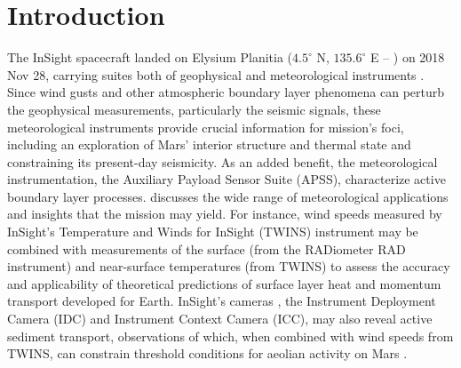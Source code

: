 \documentclass[linenumbers,trackchanges]{aastex63}
\begin{document}

\section{Introduction} \label{sec:Introduction}
The InSight spacecraft landed on Elysium Planitia ($4.5^\circ$ N, $135.6^\circ$ E -- \citealp{2020E&SS....701248G}) on 2018 Nov 28, carrying suites both of geophysical \citep{2020NatGe..13..183B} and meteorological instruments \citep{Banfield2019,2020NatGe..13..190B}. Since wind gusts and other atmospheric boundary layer phenomena can perturb the geophysical measurements, particularly the seismic signals, these meteorological instruments provide crucial information for mission's foci, including an exploration of Mars' interior structure and thermal state and constraining its present-day seismicity. As an added benefit, the meteorological instrumentation, the Auxiliary Payload Sensor Suite (APSS), characterize active boundary layer processes. \citet{2018SSRv..214..109S} discusses the wide range of meteorological applications and insights that the mission may yield. For instance, wind speeds measured by InSight's Temperature and Winds for InSight (TWINS) instrument may be combined with measurements of the surface (from the RADiometer RAD instrument) and near-surface temperatures (from TWINS) to assess the accuracy and applicability of theoretical predictions of surface layer heat and momentum transport developed for Earth. InSight's cameras \citep{2018SSRv..214..105M}, the Instrument Deployment Camera (IDC) and Instrument Context Camera (ICC), may also reveal active sediment transport, observations of which, when combined with wind speeds from TWINS, can constrain threshold conditions for aeolian activity on Mars \citep{2012Natur.485..339B}.
\end{document}
